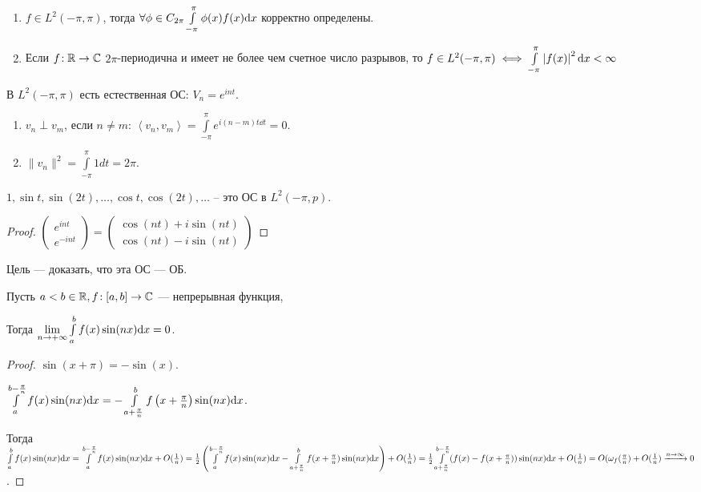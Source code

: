 \begin{enumerate}
    \item $f \in L^2(-\pi, \pi)$, тогда $\forall \phi \in C_{2 \pi} \int\limits_{-\pi}^{\pi} \phi(x)f(x) \mathrm{d}x$ корректно определены.
    \item Если $f\!: \mathbb{R} \to  \mathbb{C}$ $2\pi$-периодична и имеет не более чем счетное число разрывов, то $f \in L^2(-\pi, \pi) \iff \int\limits_{-\pi}^{\pi} \left| f(x) \right| ^2 \mathrm{d}x < \infty $ 
\end{enumerate}
В $L^2(-\pi, \pi)$ есть естественная ОС: $V_n = e^{int}$.
\begin{enumerate}
    \item $v_n \perp v_m$, если  $n \neq m$:  $\left<v_n, v_m \right> = \int\limits_{-\pi}^{\pi} e^{i(n-m)t\dd{t}} = 0$.
    \item $\|v_n\|^2 = \int\limits_{-\pi}^{\pi} 1dt = 2\pi$.
\end{enumerate}
\begin{consequence}
    $1, \sin t, \sin (2t), \ldots, \cos t, \cos(2t),\ldots$ -- это ОС в $L^2(-\pi, p)$.
\end{consequence}
\begin{proof}
    $\begin{pmatrix} e^{i n t} \\ e^{- i n t} \end{pmatrix} = \begin{pmatrix} \cos (nt) + i\sin(nt) \\ \cos(nt) - i\sin(nt) \end{pmatrix} $
\end{proof}
Цель --- доказать, что эта ОС --- ОБ.
\begin{lemma}
    Пусть $a < b \in \mathbb{R}, f\!: [a, b] \to \mathbb{C}$ --- непрерывная функция,

    Тогда  $\lim\limits_{n \to +\infty} \int\limits_{a}^{b} f(x)\sin(nx)\mathrm{d}x = 0$.
\end{lemma}
\begin{proof}
    $\sin (x+\pi) = -\sin(x)$.

    $\int\limits_{a}^{b-\frac{\pi}{n}} f(x)\sin(nx)\mathrm{d}x = -\int\limits_{a+\frac{\pi}{n}}^{b} f\left(x  +\frac{\pi}{n}\right)  \sin(nx)\mathrm{d}x$.

    Тогда $\int\limits_{a}^{b} f(x)\sin(nx)\mathrm{d}x = \int\limits_{a}^{b-\frac{\pi}{n}} f(x)\sin(nx)\mathrm{d}x + O(\frac{1}{n}) = \frac{1}{2}\left( \int\limits_{a}^{b-\frac{\pi}{n}} f(x)\sin(nx)\mathrm{d}x - \int\limits_{a+\frac{\pi}{n}}^{b} f(x+\frac{\pi}{n}) \sin(nx)\mathrm{d}x    \right) + O(\frac{1}{n}) = \frac{1}{2} \int\limits_{a+\frac{\pi}{n}}^{b-\frac{\pi}{n}}(f(x) - f(x +\frac{\pi}{n})) \sin(nx)\mathrm{d}x +O(\frac{1}{n}) = O(\omega_f(\frac{\pi}{n}) + O(\frac{1}{n}) \xrightarrow{n \to \infty} 0$.
\end{proof}
